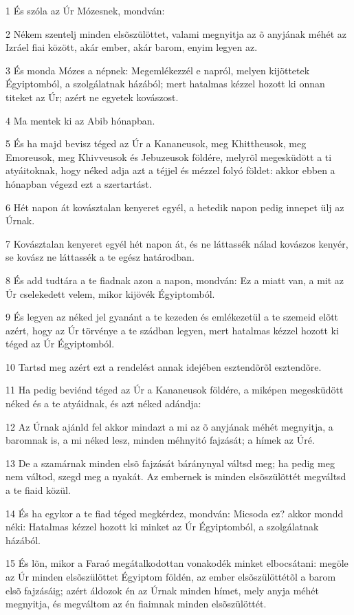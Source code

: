 \par 1 És szóla az Úr Mózesnek, mondván:
\par 2 Nékem szentelj minden elsõszülöttet, valami megnyitja az õ anyjának méhét az Izráel fiai között, akár ember, akár barom, enyim legyen az.
\par 3 És monda Mózes a népnek: Megemlékezzél e napról, melyen kijöttetek Égyiptomból, a szolgálatnak házából; mert hatalmas kézzel hozott ki onnan titeket az Úr; azért ne egyetek kovászost.
\par 4 Ma mentek ki az Abib hónapban.
\par 5 És ha majd bevisz téged az Úr a Kananeusok, meg Khittheusok, meg Emoreusok, meg Khivveusok és Jebuzeusok földére, melyrõl megesküdött a ti atyáitoknak, hogy néked adja azt a téjjel és mézzel folyó földet: akkor ebben a hónapban végezd ezt a szertartást.
\par 6 Hét napon át kovásztalan kenyeret egyél, a hetedik napon pedig innepet ülj az Úrnak.
\par 7 Kovásztalan kenyeret egyél hét napon át, és ne láttassék nálad kovászos kenyér, se kovász ne láttassék a te egész határodban.
\par 8 És add tudtára a te fiadnak azon a napon, mondván: Ez a miatt van, a mit az Úr cselekedett velem, mikor kijövék Égyiptomból.
\par 9 És legyen az néked jel gyanánt a te kezeden és emlékezetül a te szemeid elõtt azért, hogy az Úr törvénye a te szádban legyen, mert hatalmas kézzel hozott ki téged az Úr Égyiptomból.
\par 10 Tartsd meg azért ezt a rendelést annak idejében esztendõrõl esztendõre.
\par 11 Ha pedig beviénd téged az Úr a Kananeusok földére, a miképen megesküdött néked és a te atyáidnak, és azt néked adándja:
\par 12 Az Úrnak ajánld fel akkor mindazt a mi az õ anyjának méhét megnyitja, a baromnak is, a mi néked lesz, minden méhnyitó fajzását; a hímek az Úré.
\par 13 De a szamárnak minden elsõ fajzását báránynyal váltsd meg; ha pedig meg nem váltod, szegd meg a nyakát. Az embernek is minden elsõszülöttét megváltsd a te fiaid közül.
\par 14 És ha egykor a te fiad téged megkérdez, mondván: Micsoda ez? akkor mondd néki: Hatalmas kézzel hozott ki minket az Úr Égyiptomból, a szolgálatnak házából.
\par 15 És lõn, mikor a Faraó megátalkodottan vonakodék minket elbocsátani: megöle az Úr minden elsõszülöttet Égyiptom földén, az ember elsõszülöttétõl a barom elsõ fajzásáig; azért áldozok én az Úrnak minden hímet, mely anyja méhét megnyitja, és megváltom az én fiaimnak minden elsõszülöttét.
